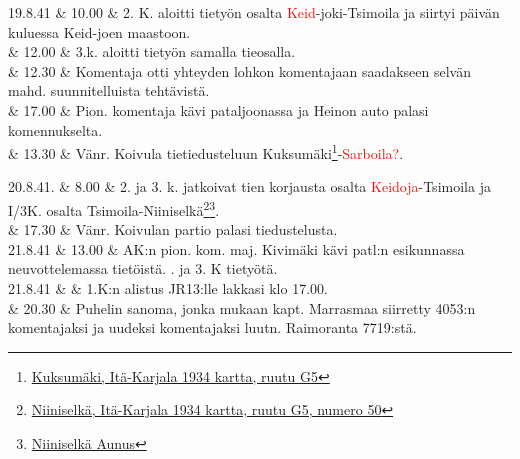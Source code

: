 \documentclass[11pt,a5paper,oneside]{book}
\begin{document}
19.8.41 & 10.00 & 2. K. aloitti tietyön osalta \textcolor{red}{Keid}-joki-Tsimoila ja siirtyi päivän kuluessa Keid-joen maastoon. \\

& 12.00 & 3.k. aloitti tietyön samalla tieosalla. \\

& 12.30 & Komentaja otti yhteyden lohkon komentajaan saadakseen selvän mahd. suunnitelluista tehtävistä. \\

& 17.00 & Pion. komentaja kävi pataljoonassa ja Heinon auto palasi komennukselta. \\

& 13.30 & Vänr. Koivula tietiedusteluun Kuksumäki\footnote{\href{https://www.google.fi/maps/place/\%D0\%9A\%D1\%83\%CC\%81\%D0\%BA\%D1\%88\%D0\%B5\%D0\%B3\%D0\%BE\%D1\%80\%D1\%8B,+Republic+of+Karelia,+Russia,+186006/}{Kuksumäki, Itä-Karjala 1934 kartta, ruutu G5}}-\textcolor{red}{Sarboila?}. \\

\taulustop


20.8.41. & 8.00 & 2. ja 3. k. jatkoivat tien korjausta osalta \textcolor{red}{Keidoja}-Tsimoila ja I/3K. osalta Tsimoila-Niiniselkä\footnote{\href{https://www.google.fi/maps/place/61\%C2\%B017'48.2\%22N+32\%C2\%B052'52.5\%22E/@61.296723,32.8790573,904m/}{Niiniselkä, Itä-Karjala 1934 kartta, ruutu G5, numero 50}}\footnote{\href{https://www.sotahistoriallisetkohteet.fi/app/sights/view/-/id/1244/country/9/area/90/s_back/1}{Niiniselkä Aunus}}. \\

& 17.30 & Vänr. Koivulan partio palasi tiedustelusta. \newline\newline\newline \\

21.8.41 & 13.00 &  AK:n pion. kom. maj. Kivimäki kävi patl:n esikunnassa neuvottelemassa tietöistä. . ja 3. K tietyötä. \newline \\

21.8.41 & & 1.K:n alistus JR13:lle lakkasi klo 17.00. \\

& 20.30 & Puhelin sanoma, jonka mukaan kapt. Marrasmaa siirretty 4053:n komentajaksi ja uudeksi komentajaksi luutn. Raimoranta 7719:stä. \newline \\
\end{document}
